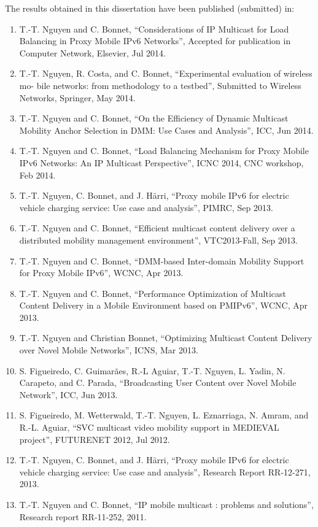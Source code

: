 The results obtained in this dissertation have been published (submitted) in:
\begin{enumerate}
\item T.-T. Nguyen and C. Bonnet, ``Considerations of IP Multicast for Load Balancing in Proxy Mobile IPv6 Networks'', Accepted for publication in Computer Network, Elsevier,  Jul 2014.
\item  T.-T. Nguyen, R. Costa, and C. Bonnet, ``Experimental evaluation of wireless mo- bile networks: from methodology to a testbed”, Submitted to Wireless Networks, Springer, May 2014.
\item T.-T. Nguyen and C. Bonnet, ``On the Efficiency of Dynamic Multicast Mobility Anchor Selection in DMM: Use Cases and Analysis'', ICC, Jun 2014.
\item T.-T.  Nguyen and C. Bonnet, ``Load Balancing Mechanism for Proxy Mobile IPv6 Networks: An IP Multicast Perspective'', ICNC 2014, CNC workshop, Feb 2014. 
\item T.-T.  Nguyen, C. Bonnet, and J. Härri, ``Proxy mobile IPv6 for electric vehicle charging service: Use case and analysis'', PIMRC, Sep 2013.
\item	T.-T.  Nguyen and C. Bonnet, ``Efficient multicast content delivery over a distributed mobility management environment'', VTC2013-Fall, Sep 2013.
\item T.-T. Nguyen and C. Bonnet, ``DMM-based Inter-domain Mobility Support for Proxy Mobile IPv6'', WCNC, Apr 2013.
\item T.-T.  Nguyen and C. Bonnet, ``Performance Optimization of Multicast Content Delivery in a Mobile Environment based on PMIPv6'',  WCNC, Apr 2013.
\item	T.-T. Nguyen and Christian Bonnet, ``Optimizing Multicast Content Delivery over Novel Mobile Networks'', ICNS, Mar 2013.
\item	S. Figueiredo, C. Guimar{\~a}es, R.-L Aguiar, T.-T.  Nguyen, L. Yadin, N. Carapeto, and C. Parada,  ``Broadcasting User Content over Novel Mobile Network'', ICC, Jun 2013.
\item	S. Figueiredo, M. Wetterwald, T.-T. Nguyen, L. Eznarriaga, N. Amram, and R.-L. Aguiar, ``SVC multicast video mobility support in MEDIEVAL project'', FUTURENET 2012, Jul 2012.
\item T.-T. Nguyen, C. Bonnet, and J. Härri, ``Proxy mobile IPv6 for electric vehicle charging service: Use case and analysis'', Research Report RR-12-271, 2013.
\item T.-T. Nguyen and C. Bonnet, ``IP mobile multicast : problems and solutions'', Research report RR-11-252, 2011.
\end{enumerate}
